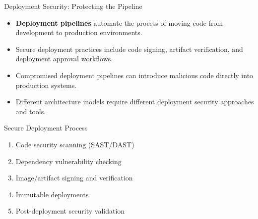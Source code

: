 \documentclass{beamer}
\begin{document}
                \begin{frame}{Deployment Security: Protecting the Pipeline}
                \begin{itemize}
                \item \textbf{Deployment pipelines} automate the process of moving code from development to production environments.
                \item Secure deployment practices include code signing, artifact verification, and deployment approval workflows.
                \item Compromised deployment pipelines can introduce malicious code directly into production systems.
                \item Different architecture models require different deployment security approaches and tools.
                \end{itemize}
                
                \begin{block}{Secure Deployment Process}
                \begin{enumerate}
                \item Code security scanning (SAST/DAST)
                \item Dependency vulnerability checking
                \item Image/artifact signing and verification
                \item Immutable deployments
                \item Post-deployment security validation
        \end{enumerate}
        \end{block}
        \end{frame}
\end{document}
